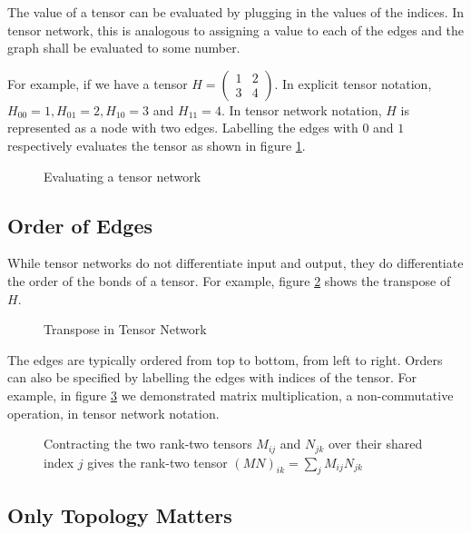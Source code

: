 The value of a tensor can be evaluated by plugging in the values of the indices. 
In tensor network, this is analogous to assigning a value to each of the edges and the graph shall be evaluated to some number. 

For example, if we have a tensor $H = \begin{pmatrix}
	1 & 2 \\
	3 & 4
\end{pmatrix} $. In explicit tensor notation, $H_{00} = 1, H_{01} = 2,  H_{10} = 3$ and $H_{11} = 4$.
In tensor network notation, $H$ is represented as a node with two edges. Labelling the edges with $0$ and $1$ respectively evaluates the tensor as shown in figure \ref{fig:tensor-net-eval}.

\begin{figure}[ht]
	\centering
	
	\caption{Evaluating a tensor network}
	\label{fig:tensor-net-eval}
\end{figure}
\subsection{Order of Edges}


While tensor networks do not differentiate input and output, they do differentiate the order of the bonds of a tensor. 
For example, figure \ref{fig:tensor-transpose} shows the transpose of $H$.
\begin{figure}[ht]
	\centering
	
	\caption{Transpose in Tensor Network}
	\label{fig:tensor-transpose}
\end{figure}


The edges are typically ordered from top to bottom, from left to right. 
Orders can also be specified by labelling the edges with indices of the tensor. 
For example, in figure \ref{fig:contraction-matrix-mult} we demonstrated matrix multiplication, a non-commutative operation, in tensor network notation.

\begin{figure}[ht]
	\centering
	
\caption{Contracting the two rank-two tensors $M_{ij}$ and $N_{jk}$ over their shared index $j$ gives the rank-two tensor $(MN)_{ik} = \sum_j M_{ij} N_{jk}$}
	\label{fig:contraction-matrix-mult}
\end{figure}

\subsection{Only Topology Matters}

